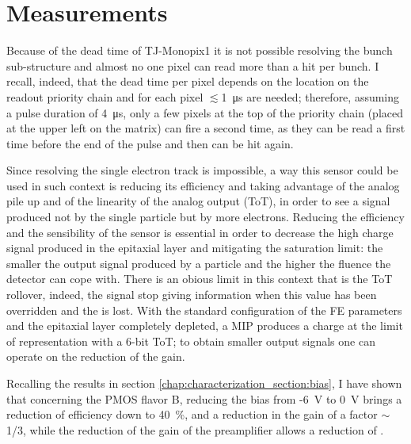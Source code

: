 \section{Measurements}\label{sec:Santa_chiara_measurement}
   Because of the dead time of TJ-Monopix1 it is not possible resolving the bunch sub-structure and almost no one pixel can read more than a hit per bunch. I recall, indeed, that the dead time per pixel depends on the location on the readout priority chain and for each pixel $\lesssim$\SI{1}{\us} are needed; therefore, assuming a pulse duration of \SI{4}{\us}, only a few pixels at the top of the priority chain (placed at the upper left on the matrix) can fire a second time, as they can be read a first time before the end of the pulse and then can be hit again.

   Since resolving the single electron track is impossible, a way this sensor could be used in such context is reducing its efficiency and taking advantage of the analog pile up and of the linearity of the analog output (ToT), in order to see a signal produced not by the single particle but by more electrons. 
   Reducing the efficiency and the sensibility of the sensor is essential in order to decrease the high charge signal produced in the epitaxial layer and mitigating the saturation limit: the smaller the output signal produced by a particle and the higher the fluence the detector can cope with.
   There is an obious limit in this context that is the ToT rollover, indeed, the signal stop giving information when this value has been overridden and the  is lost.
   With the standard configuration of the FE parameters and the epitaxial layer completely depleted, a MIP produces a charge at the limit of representation with a 6-bit ToT; to obtain smaller output signals one can operate on the reduction of the gain.

   Recalling the results in section \ref{chap:characterization_section:bias}, I have shown that concerning the PMOS flavor B, reducing the bias from -\SI{6}{V} to \SI{0}{V} brings a reduction of efficiency down to \SI{40}{\%}, and a reduction in the gain of a factor $\sim$1/3, while the reduction of the gain of the preamplifier allows a reduction of .
   
